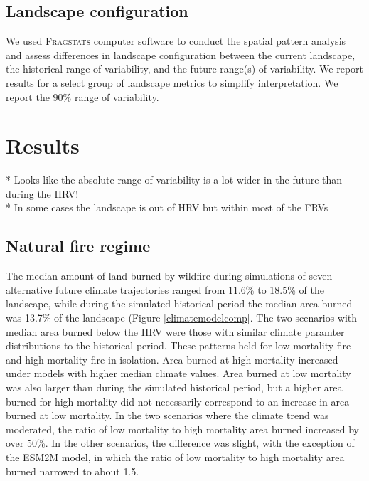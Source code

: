 \documentclass[12pt]{article}
\begin{document}
\begin{spacing}{1}
\subsection*{Landscape configuration}
We used \textsc{Fragstats} computer software \citep{McGarigal2012} to conduct the spatial pattern analysis and assess differences in landscape configuration between the current landscape, the historical range of variability, and the future range(s) of variability. We report results for a select group of landscape metrics to simplify interpretation. We report the 90\% range of variability. %

\section*{Results}
* Looks like the absolute range of variability is a lot wider in the future than during the HRV!  \\
* In some cases the landscape is out of HRV but within most of the FRVs

\subsection*{Natural fire regime}
The median amount of land burned by wildfire during simulations of seven alternative future climate trajectories ranged from 11.6\% to 18.5\% of the landscape, while during the simulated historical period the median area burned was 13.7\% of the landscape (Figure \ref{climatemodelcomp}. The two scenarios with median area burned below the HRV were those with similar climate paramter distributions to the historical period. These patterns held for low mortality fire and high mortality fire in isolation. Area burned at high mortality increased under models with higher median climate values. Area burned at low mortality was also larger than during the simulated historical period, but a higher area burned for high mortality did not necessarily correspond to an increase in area burned at low mortality. In the two scenarios where the climate trend was moderated, the ratio of low mortality to high mortality area burned increased by over 50\%. In the other scenarios, the difference was slight, with the exception of the ESM2M model, in which the ratio of low mortality to high mortality area burned narrowed to about 1.5. 


\end{spacing}
\end{document}
